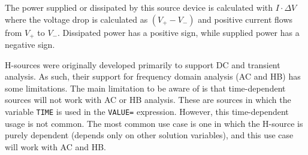 \begin{Device}
The power supplied or dissipated by this source device is calculated
with $I \cdot \Delta V$ where the voltage drop is calculated as $(V_+ - V_-)$
and positive current flows from $V_+$ to $V_-$.  Dissipated power has a
positive sign, while supplied power has a negative sign.

H-sources were originally developed primarily to support DC and transient analysis.  
As such, their support for frequency domain analysis (AC and HB) has some limitations.  
The main limitation to be aware of is that time-dependent sources will not work with AC or HB analysis.  
These are sources in which the variable \texttt{TIME} is used in the \texttt{VALUE=} expression. 
However, this time-dependent usage is not common.  The most 
common use case is one in which the H-source is purely dependent (depends only 
on other solution variables), and this use case will work with AC and HB.  

\end{Device}
